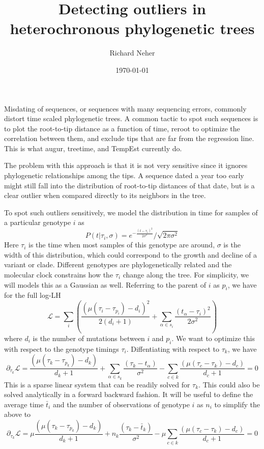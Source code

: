 \documentclass[aps,rmp, onecolumn]{revtex4}
\newcommand{\LH}{\mathcal{L}}
\begin{document}
\title{Detecting outliers in heterochronous phylogenetic trees}
\author{Richard Neher}
\date{\today}
\maketitle
Misdating of sequences, or sequences with many sequencing errors, commonly distort time scaled phylogenetic trees.
A common tactic to spot such sequences is to plot the root-to-tip distance as a function of time, reroot to optimize the correlation between them, and exclude tips that are far from the regression line.
This is what augur, treetime, and TempEst currently do.

The problem with this approach is that it is not very sensitive since it ignores phylogenetic relationships among the tips.
A sequence dated a year too early might still fall into the distribution of root-to-tip distances of that date, but is a clear outlier when compared directly to its neighbors in the tree.

To spot such outliers sensitively, we model the distribution in time for samples of a particular genotype $i$ as
\begin{equation}
    P(t|\tau_i, \sigma) = e^{-\frac{(t-\tau_i)^2}{2\sigma^2}}/\sqrt{2\pi\sigma^2}
\end{equation}
Here $\tau_i$ is the time when most samples of this genotype are around, $\sigma$ is the width of this distribution, which could correspond to the growth and decline of a variant or clade.
Different genotypes are phylogenetically related and the molecular clock constrains how the $\tau_i$ change along the tree.
For simplicity, we will models this as a Gaussian as well.
Referring to the parent of $i$ as $p_i$, we have for the full log-LH
\begin{equation}
    \LH  = \sum_i \left(\frac{(\mu(\tau_i - \tau_{p_i}) - d_i)^2}{2(d_i+1)} + \sum_{\alpha \in s_i} \frac{(t_\alpha-\tau_i)^2}{2\sigma^2} \right)
\end{equation}
where $d_i$ is the number of mutations between $i$ and $p_i$.
We want to optimize this with respect to the genotype timings $\tau_i$.
Diffentiating with respect to $\tau_k$, we have
\begin{equation}
    \partial_{\tau_k} \LH  = \frac{(\mu(\tau_k - \tau_{p_k}) - d_k)}{d_k+1} + \sum_{\alpha \in s_k} \frac{(\tau_k-t_\alpha)}{\sigma^2} -  \sum_{c\in k} \frac{(\mu(\tau_{c} - \tau_{k}) - d_c)}{d_c+1} = 0
\end{equation}
This is a sparse linear system that can be readily solved for $\tau_k$. This could also be solved analytically in a forward backward fashion.
It will be useful to define the average time $\bar{t}_i$ and the number of observations of genotype $i$ as $n_i$ to simplify the above to
\begin{equation}
    \partial_{\tau_k} \LH  = \mu\frac{(\mu(\tau_k - \tau_{p_k}) -  d_k)}{d_k+1} +  n_k\frac{(\tau_k-\bar{t}_k)}{\sigma^2} -  \mu\sum_{c\in k} \frac{(\mu(\tau_{c} - \tau_{k}) - d_c)}{d_c+1} = 0
\end{equation}
\end{document}
